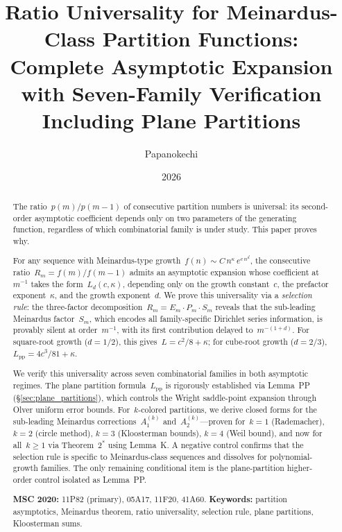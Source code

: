 \documentclass[11pt,a4paper]{article}
\title{Ratio Universality for Meinardus-Class Partition Functions:\\[4pt]
\large Complete Asymptotic Expansion with Seven-Family Verification\\
Including Plane Partitions}
\author{Papanokechi}
\date{2026}
\begin{document}
\maketitle

\begin{abstract}
The ratio~$p(m)/p(m-1)$ of consecutive partition numbers is universal: its second-order asymptotic coefficient depends only on two parameters of the generating function, regardless of which combinatorial family is under study. This paper proves why.

For any sequence with Meinardus-type growth~$f(n) \sim C\,n^{\kappa}\,e^{c\,n^d}$, the consecutive ratio~$R_m = f(m)/f(m-1)$ admits an asymptotic expansion whose coefficient at~$m^{-1}$ takes the form~$L_d(c,\kappa)$, depending only on the growth constant~$c$, the prefactor exponent~$\kappa$, and the growth exponent~$d$. We prove this universality via a \emph{selection rule}: the three-factor decomposition~$R_m = E_m \cdot P_m \cdot S_m$ reveals that the sub-leading Meinardus factor~$S_m$, which encodes all family-specific Dirichlet series information, is provably silent at order~$m^{-1}$, with its first contribution delayed to~$m^{-(1+d)}$. For square-root growth ($d=1/2$), this gives~$L = c^2/8 + \kappa$; for cube-root growth ($d=2/3$), $L_{\mathrm{pp}} = 4c^3/81 + \kappa$.

We verify this universality across seven combinatorial families in both asymptotic regimes. The plane partition formula~$L_{\mathrm{pp}}$ is rigorously established via Lemma~PP (\S\ref{sec:plane_partitions}), which controls the Wright saddle-point expansion through Olver uniform error bounds. For~$k$-colored partitions, we derive closed forms for the sub-leading Meinardus corrections~$A_1^{(k)}$ and~$A_2^{(k)}$---proven for~$k = 1$ (Rademacher), $k = 2$ (circle method), $k = 3$ (Kloosterman bounds), $k = 4$ (Weil bound), and now for all~$k \ge 1$ via Theorem~$2^*$ using Lemma~K. A negative control confirms that the selection rule is specific to Meinardus-class sequences and dissolves for polynomial-growth families. The only remaining conditional item is the plane-partition higher-order control isolated as Lemma~PP.

\medskip\noindent
\textbf{MSC 2020:} 11P82 (primary), 05A17, 11F20, 41A60.
\quad
\textbf{Keywords:} partition asymptotics, Meinardus theorem, ratio universality, selection rule, plane partitions, Kloosterman sums.
\end{abstract}
\end{document}
